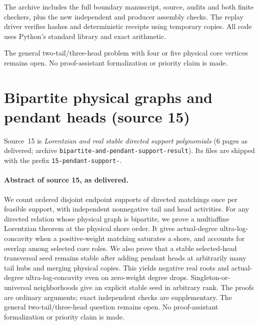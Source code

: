 \documentclass[11pt]{article}
\numberwithin{equation}{section}
\theoremstyle{definition}\newtheorem{definition}[theorem]{Definition}\newtheorem{remark}[theorem]{Remark}
\begin{document}
The archive includes the full boundary manuscript, source, audits and both
finite checkers, plus the new independent and producer assembly checks.
The replay driver verifies hashes and deterministic receipts using temporary
copies. All code uses Python's standard library and exact arithmetic.

The general two-tail/three-head problem with four or five physical core
vertices remains open. No proof-assistant formalization or priority claim
is made.


\section{Bipartite physical graphs and pendant heads (source 15)}\label{pgr:r:ps:sec}

Source~15 is \emph{Lorentzian and real stable directed support polynomials}
(6 pages as delivered; archive \texttt{bipartite-and-pendant-support-result}).
Its files are shipped with the prefix \texttt{15-pendant-support-}.

\paragraph{Abstract of source 15, as delivered.}

We count ordered disjoint endpoint supports of directed matchings once per feasible support, with independent nonnegative tail and head activities. For any directed relation whose physical graph is bipartite, we prove a multiaffine Lorentzian theorem at the physical shore order. It gives actual-degree ultra-log-concavity when a positive-weight matching saturates a shore, and accounts for overlap among selected core roles. We also prove that a stable selected-head transversal seed remains stable after adding pendant heads at arbitrarily many tail hubs and merging physical copies. This yields negative real roots and actual-degree ultra-log-concavity even on zero-weight degree drops. Singleton-or-universal neighborhoods give an explicit stable seed in arbitrary rank. The proofs are ordinary arguments; exact independent checks are supplementary. The general two-tail/three-head question remains open. No proof-assistant formalization or priority claim is made.
\end{document}
